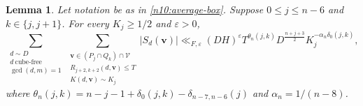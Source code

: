 \documentclass[a4paper,11pt, twoside,reqno]{amsart}
\theoremstyle{plain}
\newtheorem{lemma}[thm]{Lemma}
\theoremstyle{definition}
\theoremstyle{remark}
\newcommand{\bfv}{\bm{v}}
\newcommand{\ve}{\varepsilon}
\renewcommand{\le}{\leqslant}
\renewcommand{\ge}{\geqslant}
\numberwithin{equation}{section}
\begin{document}
\begin{lemma}\label{n10:weighted-conductor}
Let notation be as in \eqref{n10:average-box}.
Suppose $0\le j\le n-6$ and $k\in \{j,j+1\}$.
For every $K_j\ge 1/2$ and $\ve>0$,
\begin{equation}\label{n10:weighted-mean}
\sum_{\substack{
d\sim D\\d\ \mathrm{cube\text{-}free}\\
\gcd(d,m)=1}}
\sum_{\substack{
\bfv\in(P_j\cap Q_k)\cap\mathcal V\\
R_{j+2,k+2}(d,\bfv)\le T\\
K(d,\bfv) \sim K_j}}
|S_d(\bfv)|
\ll_{F,\ve}
(DH)^\ve T^{\theta_n(j,k)}D^{\frac{n+j+3}{2}}
K_j^{-\alpha_n\delta_0(j,k)},
\end{equation}
where $\theta_n(j,k) = n-j-1+\delta_0(j,k)-\delta_{n-7,n-6}(j)$
and $\alpha_n = 1/(n-8)$.
\end{lemma}
\end{document}
